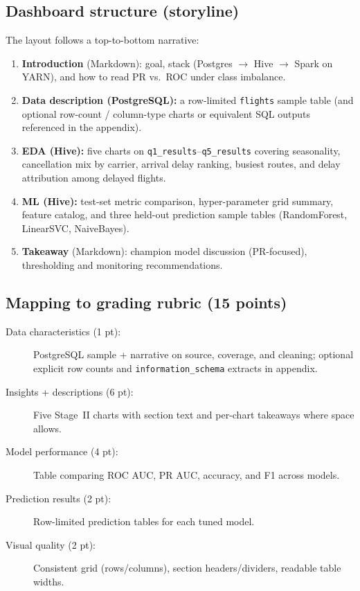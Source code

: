 \subsection{Dashboard structure (storyline)}
The layout follows a top-to-bottom narrative:
\begin{enumerate}
  \item \textbf{Introduction} (Markdown): goal, stack (Postgres $\rightarrow$ Hive $\rightarrow$ Spark on YARN), and how to read PR vs.\ ROC under class imbalance.
  \item \textbf{Data description (PostgreSQL):} a row-limited \texttt{flights} sample table (and optional row-count / column-type charts or equivalent SQL outputs referenced in the appendix).
  \item \textbf{EDA (Hive):} five charts on \texttt{q1\_results}--\texttt{q5\_results} covering seasonality, cancellation mix by carrier, arrival delay ranking, busiest routes, and delay attribution among delayed flights.
  \item \textbf{ML (Hive):} test-set metric comparison, hyper-parameter grid summary, feature catalog, and three held-out prediction sample tables (RandomForest, LinearSVC, NaiveBayes).
  \item \textbf{Takeaway} (Markdown): champion model discussion (PR-focused), thresholding and monitoring recommendations.
\end{enumerate}

\subsection{Mapping to grading rubric (15 points)}
\begin{description}
  \item[Data characteristics (1 pt):] PostgreSQL sample + narrative on source, coverage, and cleaning; optional explicit row counts and \texttt{information\_schema} extracts in appendix.
  \item[Insights + descriptions (6 pt):] Five Stage~II charts with section text and per-chart takeaways where space allows.
  \item[Model performance (4 pt):] Table comparing ROC AUC, PR AUC, accuracy, and F1 across models.
  \item[Prediction results (2 pt):] Row-limited prediction tables for each tuned model.
  \item[Visual quality (2 pt):] Consistent grid (rows/columns), section headers/dividers, readable table widths.
\end{description}

